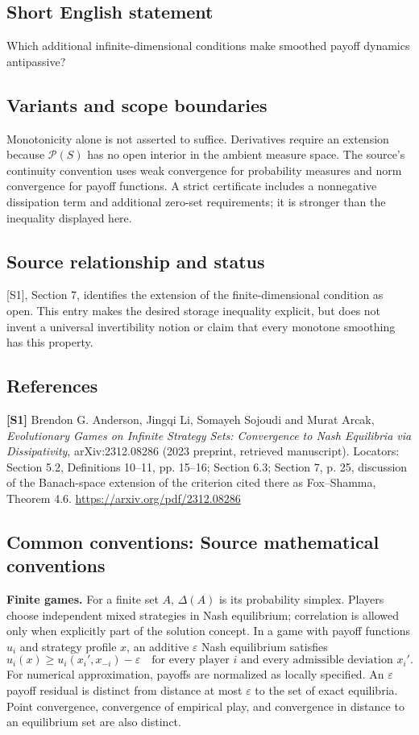 \documentclass[11pt,a4paper]{article}
\begin{document}
\subsection*{Short English statement}
Which additional infinite-dimensional conditions make smoothed payoff dynamics antipassive?
\subsection*{Variants and scope boundaries}
Monotonicity alone is not asserted to suffice. Derivatives require an extension because $\mathcal P(S)$ has no open interior in the ambient measure space. The source's continuity convention uses weak convergence for probability measures and norm convergence for payoff functions. A strict certificate includes a nonnegative dissipation term and additional zero-set requirements; it is stronger than the inequality displayed here.
\subsection*{Source relationship and status}
[S1], Section 7, identifies the extension of the finite-dimensional condition as open. This entry makes the desired storage inequality explicit, but does not invent a universal invertibility notion or claim that every monotone smoothing has this property.
\subsection*{References}
\begingroup\footnotesize\raggedright
\textbf{[S1]} Brendon G. Anderson, Jingqi Li, Somayeh Sojoudi and Murat Arcak, \emph{Evolutionary Games on Infinite Strategy Sets: Convergence to Nash Equilibria via Dissipativity}, arXiv:2312.08286 (2023 preprint, retrieved manuscript). Locators: Section 5.2, Definitions 10--11, pp. 15--16; Section 6.3; Section 7, p. 25, discussion of the Banach-space extension of the criterion cited there as Fox--Shamma, Theorem 4.6. \url{https://arxiv.org/pdf/2312.08286}
\par\endgroup

\subsection*{Common conventions: Source mathematical conventions}

\textbf{Finite games.} For a finite set $A$, $\Delta(A)$ is its probability
simplex. Players choose independent mixed strategies in Nash equilibrium;
correlation is allowed only when explicitly part of the solution concept.
In a game with payoff functions $u_i$ and strategy profile $x$, an additive
$\varepsilon$ Nash equilibrium satisfies
\[
 u_i(x)\geq u_i(x_i',x_{-i})-\varepsilon
 \quad\text{for every player $i$ and every admissible deviation $x_i'$}.
\]
For numerical approximation, payoffs are normalized as locally specified.
An $\varepsilon$ payoff residual is distinct from distance at most
$\varepsilon$ to the set of exact equilibria. Point convergence, convergence
of empirical play, and convergence in distance to an equilibrium set are
also distinct.
\end{document}
